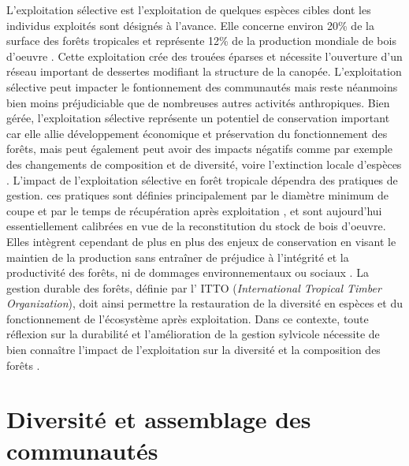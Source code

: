 \documentclass[
  11pt,
  french,
  A4paper,
  extrafontsizes,onecolumn,openright
  ]{memoir}
\begin{document}
L'exploitation sélective est l'exploitation de quelques espèces cibles
dont les individus exploités sont désignés à l'avance. Elle concerne
environ 20\% de la surface des forêts tropicales et représente 12\% de
la production mondiale de bois d'oeuvre \autocite{Martin2015}. Cette
exploitation crée des trouées éparses et nécessite l'ouverture d'un
réseau important de dessertes modifiant la structure de la canopée.
L'exploitation sélective peut impacter le fontionnement des communautés
mais reste néanmoins bien moins préjudiciable que de nombreuses autres
activités anthropiques. Bien gérée, l'exploitation sélective représente
un potentiel de conservation important car elle allie développement
économique et préservation du fonctionnement des forêts, mais peut
également peut avoir des impacts négatifs comme par exemple des
changements de composition et de diversité, voire l'extinction locale
d'espèces \autocite{Gibson2011}. L'impact de l'exploitation sélective en
forêt tropicale dépendra des pratiques de gestion. ces pratiques sont
définies principalement par le diamètre minimum de coupe et par le temps
de récupération après exploitation \autocite{Sist2015}, et sont
aujourd'hui essentiellement calibrées en vue de la reconstitution du
stock de bois d'oeuvre. Elles intègrent cependant de plus en plus des
enjeux de conservation en visant le maintien de la production sans
entraîner de préjudice à l'intégrité et la productivité des forêts, ni
de dommages environnementaux ou sociaux \autocite{ITTO2005}. La gestion
durable des forêts, définie par l' ITTO (\emph{International Tropical
Timber Organization}), doit ainsi permettre la restauration de la
diversité en espèces et du fonctionnement de l'écosystème après
exploitation. Dans ce contexte, toute réflexion sur la durabilité et
l'amélioration de la gestion sylvicole nécessite de bien connaître
l'impact de l'exploitation sur la diversité et la composition des forêts
.

\section{Diversité et assemblage des
communautés}\label{diversite-et-assemblage-des-communautes}
\end{document}
